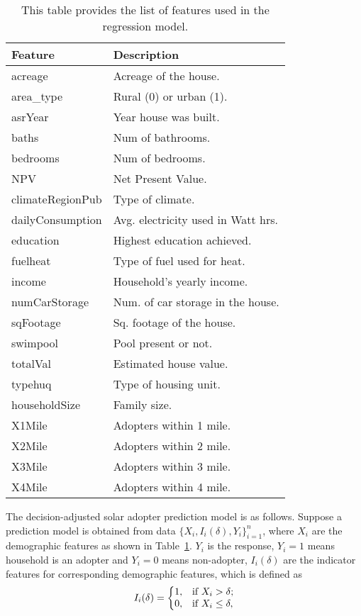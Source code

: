 \begin{table}[H]
	\centering
	\caption{This table provides the list of features used in the
          regression model.}
	\begin{tabular}{|l|p{5cm}|}
		\hline
		{\bf Feature} & {\bf Description} \\ 
		\hline
		acreage & Acreage of the house. \\ 
		\hline
		area\_type & Rural (0) or urban (1). \\ 
		\hline
		asrYear & Year house was built.  \\ 
		\hline
		baths & Num of bathrooms. \\ 
		\hline
		bedrooms & Num of bedrooms. \\ 
		\hline
		NPV & Net Present Value. \\ 
		\hline
		climateRegionPub & Type of climate. \\ 
		\hline
		dailyConsumption & Avg. electricity used in Watt
                                   hrs. \\ 
		\hline
		education & Highest education achieved. \\ 
		\hline
	    fuelheat & Type of fuel used for heat. \\ 
	    \hline
		income & Household's yearly income.  \\ 
		\hline
		numCarStorage & Num. of car storage in the house. \\
		\hline 
		sqFootage & Sq. footage of the house.  \\ 
		\hline
		swimpool & Pool present or not. \\ 
		\hline
		totalVal & Estimated house value. \\
		\hline 
		typehuq & Type of housing unit. \\ 
		\hline
		householdSize & Family size. \\ 
		\hline
		X1Mile & Adopters within 1 mile. \\ 
		X2Mile & Adopters within 2 mile. \\ 
		X3Mile & Adopters within 3 mile. \\ 
		X4Mile & Adopters within 4 mile. \\ 
		\hline
	\end{tabular}
	\label{tab: feature description}
\end{table}

The decision-adjusted solar adopter prediction model is as
follows. Suppose a prediction model is obtained from data
$\{X_i,I_i(\delta),Y_i\}_{i=1}^n$, where $X_i$ are the demographic features as
shown in Table~\ref{tab: feature description}.  $Y_i$ is the response,
$Y_i = 1$ means household is an adopter and $Y_i = 0$ means non-adopter, $I_i(\delta)$ are the indicator features for corresponding demographic features, which is defined as
\begin{equation*}
I_i(\delta)=\left\{
\begin{array}{@{}ll@{}}
1, & \text{if }X_i > \delta;\\
0, & \text{if }X_i \leq \delta,
\end{array}\right.
\end{equation*}

